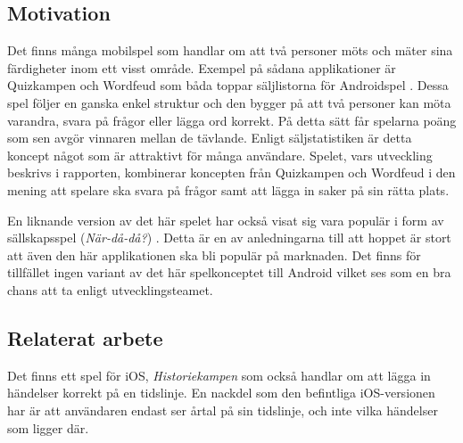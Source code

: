 \documentclass[a4paper, 11pt]{article}
\begin{document}
\subsection{Motivation}
Det finns många mobilspel som handlar om att två personer möts och mäter sina färdigheter inom ett visst område. Exempel på sådana applikationer är Quizkampen och Wordfeud som båda toppar säljlistorna för Androidspel \cite{appsalesrating}. Dessa spel följer en ganska enkel struktur och den bygger på att två personer kan möta varandra, svara på frågor eller lägga ord korrekt. På detta sätt får spelarna poäng som sen avgör vinnaren mellan de tävlande. Enligt säljstatistiken \cite{appsalesrating} är detta koncept något som är attraktivt för många användare. Spelet, vars utveckling beskrivs i rapporten, kombinerar koncepten från Quizkampen och Wordfeud i den mening att spelare ska svara på frågor samt att lägga in saker på sin rätta plats. 

En liknande version av det här spelet har också visat sig vara populär i form av sällskapsspel (\textit{När-då-då?}) \cite{nardada}. Detta är en av anledningarna till att hoppet är stort att även den här applikationen ska bli populär på marknaden. Det finns för tillfället ingen variant av det här spelkonceptet till Android vilket ses som en bra chans att ta enligt utvecklingsteamet.

\subsection{Relaterat arbete}
Det finns ett spel för iOS, \textit{Historiekampen} \cite{historiekampen} som också handlar om att lägga in händelser korrekt på en tidslinje. En nackdel som den befintliga iOS-versionen har är att användaren endast ser årtal på sin tidslinje, och inte vilka händelser som ligger där.
\end{document}

